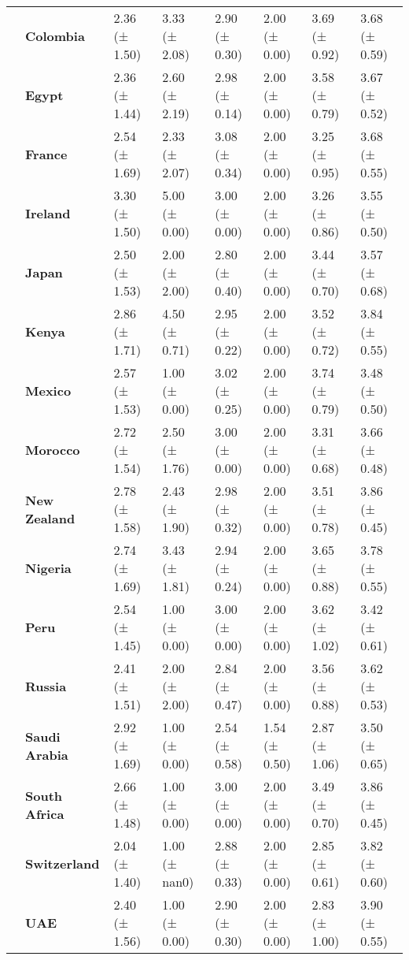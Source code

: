 \begin{longtable}{llllllll}
\textbf{} & \textbf{Colombia} & 2.36 (± 1.50) & 3.33 (± 2.08) & 2.90 (± 0.30) & 2.00 (± 0.00) & 3.69 (± 0.92) & 3.68 (± 0.59) \\
\textbf{} & \textbf{Egypt} & 2.36 (± 1.44) & 2.60 (± 2.19) & 2.98 (± 0.14) & 2.00 (± 0.00) & 3.58 (± 0.79) & 3.67 (± 0.52) \\
\textbf{} & \textbf{France} & 2.54 (± 1.69) & 2.33 (± 2.07) & 3.08 (± 0.34) & 2.00 (± 0.00) & 3.25 (± 0.95) & 3.68 (± 0.55) \\
\textbf{} & \textbf{Ireland} & 3.30 (± 1.50) & 5.00 (± 0.00) & 3.00 (± 0.00) & 2.00 (± 0.00) & 3.26 (± 0.86) & 3.55 (± 0.50) \\
\textbf{} & \textbf{Japan} & 2.50 (± 1.53) & 2.00 (± 2.00) & 2.80 (± 0.40) & 2.00 (± 0.00) & 3.44 (± 0.70) & 3.57 (± 0.68) \\
\textbf{} & \textbf{Kenya} & 2.86 (± 1.71) & 4.50 (± 0.71) & 2.95 (± 0.22) & 2.00 (± 0.00) & 3.52 (± 0.72) & 3.84 (± 0.55) \\
\textbf{} & \textbf{Mexico} & 2.57 (± 1.53) & 1.00 (± 0.00) & 3.02 (± 0.25) & 2.00 (± 0.00) & 3.74 (± 0.79) & 3.48 (± 0.50) \\
\textbf{} & \textbf{Morocco} & 2.72 (± 1.54) & 2.50 (± 1.76) & 3.00 (± 0.00) & 2.00 (± 0.00) & 3.31 (± 0.68) & 3.66 (± 0.48) \\
\textbf{} & \textbf{New Zealand} & 2.78 (± 1.58) & 2.43 (± 1.90) & 2.98 (± 0.32) & 2.00 (± 0.00) & 3.51 (± 0.78) & 3.86 (± 0.45) \\
\textbf{} & \textbf{Nigeria} & 2.74 (± 1.69) & 3.43 (± 1.81) & 2.94 (± 0.24) & 2.00 (± 0.00) & 3.65 (± 0.88) & 3.78 (± 0.55) \\
\textbf{} & \textbf{Peru} & 2.54 (± 1.45) & 1.00 (± 0.00) & 3.00 (± 0.00) & 2.00 (± 0.00) & 3.62 (± 1.02) & 3.42 (± 0.61) \\
\textbf{} & \textbf{Russia} & 2.41 (± 1.51) & 2.00 (± 2.00) & 2.84 (± 0.47) & 2.00 (± 0.00) & 3.56 (± 0.88) & 3.62 (± 0.53) \\
\textbf{} & \textbf{Saudi Arabia} & 2.92 (± 1.69) & 1.00 (± 0.00) & 2.54 (± 0.58) & 1.54 (± 0.50) & 2.87 (± 1.06) & 3.50 (± 0.65) \\
\textbf{} & \textbf{South Africa} & 2.66 (± 1.48) & 1.00 (± 0.00) & 3.00 (± 0.00) & 2.00 (± 0.00) & 3.49 (± 0.70) & 3.86 (± 0.45) \\
\textbf{} & \textbf{Switzerland} & 2.04 (± 1.40) & 1.00 (± nan0) & 2.88 (± 0.33) & 2.00 (± 0.00) & 2.85 (± 0.61) & 3.82 (± 0.60) \\
\textbf{} & \textbf{UAE} & 2.40 (± 1.56) & 1.00 (± 0.00) & 2.90 (± 0.30) & 2.00 (± 0.00) & 2.83 (± 1.00) & 3.90 (± 0.55) \\

\end{longtable}
